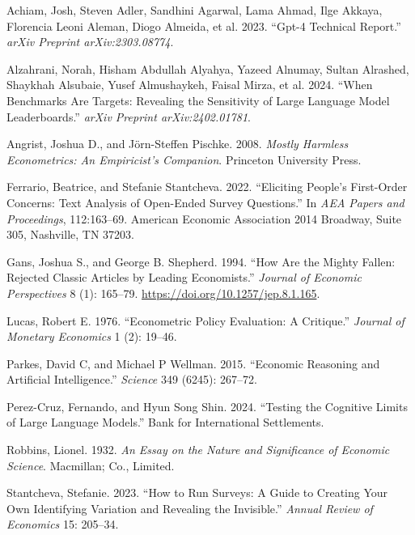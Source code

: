 \documentclass[
]{article}
\newlength{\cslhangindent}
\newenvironment{CSLReferences}[2] %
 {\begin{list}{}{%
  \setlength{\itemindent}{0pt}
  \setlength{\leftmargin}{0pt}
  \setlength{\parsep}{0pt}
  \ifodd #1
   \setlength{\leftmargin}{\cslhangindent}
   \setlength{\itemindent}{-1\cslhangindent}
  \fi
  \setlength{\itemsep}{#2\baselineskip}}}
 {\end{list}}
\begin{document}
\label{refs}
\begin{CSLReferences}{1}{0}
Achiam, Josh, Steven Adler, Sandhini Agarwal, Lama Ahmad, Ilge Akkaya,
Florencia Leoni Aleman, Diogo Almeida, et al. 2023. {``Gpt-4 Technical
Report.''} \emph{arXiv Preprint arXiv:2303.08774}.

Alzahrani, Norah, Hisham Abdullah Alyahya, Yazeed Alnumay, Sultan
Alrashed, Shaykhah Alsubaie, Yusef Almushaykeh, Faisal Mirza, et al.
2024. {``When Benchmarks Are Targets: Revealing the Sensitivity of Large
Language Model Leaderboards.''} \emph{arXiv Preprint arXiv:2402.01781}.

Angrist, Joshua D., and Jörn-Steffen Pischke. 2008. \emph{Mostly
Harmless Econometrics: An Empiricist's Companion}. Princeton University
Press.

Ferrario, Beatrice, and Stefanie Stantcheva. 2022. {``Eliciting People's
First-Order Concerns: Text Analysis of Open-Ended Survey Questions.''}
In \emph{AEA Papers and Proceedings}, 112:163--69. American Economic
Association 2014 Broadway, Suite 305, Nashville, TN 37203.

Gans, Joshua S., and George B. Shepherd. 1994. {``How Are the Mighty
Fallen: Rejected Classic Articles by Leading Economists.''}
\emph{Journal of Economic Perspectives} 8 (1): 165--79.
\url{https://doi.org/10.1257/jep.8.1.165}.

Lucas, Robert E. 1976. {``Econometric Policy Evaluation: A Critique.''}
\emph{Journal of Monetary Economics} 1 (2): 19--46.

Parkes, David C, and Michael P Wellman. 2015. {``Economic Reasoning and
Artificial Intelligence.''} \emph{Science} 349 (6245): 267--72.

Perez-Cruz, Fernando, and Hyun Song Shin. 2024. {``Testing the Cognitive
Limits of Large Language Models.''} Bank for International Settlements.

Robbins, Lionel. 1932. \emph{An Essay on the Nature and Significance of
Economic Science}. Macmillan; Co., Limited.

Stantcheva, Stefanie. 2023. {``How to Run Surveys: A Guide to Creating
Your Own Identifying Variation and Revealing the Invisible.''}
\emph{Annual Review of Economics} 15: 205--34.


\end{CSLReferences}
\end{document}

